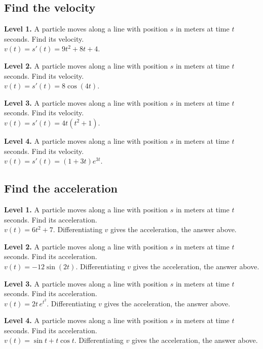 \documentclass[11pt]{article}
\begin{document}
\subsection*{Find the velocity}
\noindent\textbf{Level 1.} A particle moves along a line with position $s$ in meters at time $t$ seconds. Find its velocity.\\  \quad $v(t)=s'(t)=9t^{2}+8t+4$.\par\medskip
\noindent\textbf{Level 2.} A particle moves along a line with position $s$ in meters at time $t$ seconds. Find its velocity.\\  \quad $v(t)=s'(t)=8\cos(4t)$.\par\medskip
\noindent\textbf{Level 3.} A particle moves along a line with position $s$ in meters at time $t$ seconds. Find its velocity.\\  \quad $v(t)=s'(t)=4t(t^{2}+1)$.\par\medskip
\noindent\textbf{Level 4.} A particle moves along a line with position $s$ in meters at time $t$ seconds. Find its velocity.\\  \quad $v(t)=s'(t)=(1+3t)e^{3t}$.\par\medskip
\subsection*{Find the acceleration}
\noindent\textbf{Level 1.} A particle moves along a line with position $s$ in meters at time $t$ seconds. Find its acceleration.\\  \quad $v(t)=6t^{2}+7$. Differentiating $v$ gives the acceleration, the answer above.\par\medskip
\noindent\textbf{Level 2.} A particle moves along a line with position $s$ in meters at time $t$ seconds. Find its acceleration.\\  \quad $v(t)=-12\sin(2t)$. Differentiating $v$ gives the acceleration, the answer above.\par\medskip
\noindent\textbf{Level 3.} A particle moves along a line with position $s$ in meters at time $t$ seconds. Find its acceleration.\\  \quad $v(t)=2t\,e^{t^{2}}$. Differentiating $v$ gives the acceleration, the answer above.\par\medskip
\noindent\textbf{Level 4.} A particle moves along a line with position $s$ in meters at time $t$ seconds. Find its acceleration.\\  \quad $v(t)=\sin t+t\cos t$. Differentiating $v$ gives the acceleration, the answer above.\par\medskip
\end{document}
